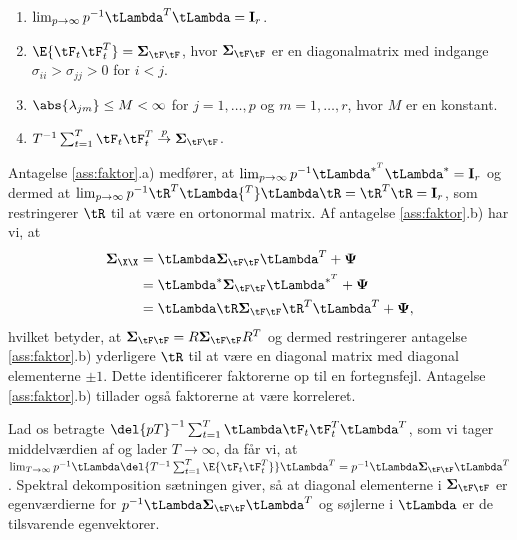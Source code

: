 %
\begin{ass} \label{ass:faktor}
\begin{enumerate}[label=\alph*)]
\item \(\lim_{p \rightarrow \infty} p^{-1} \tLambda^T \tLambda = \mathbf{I}_r\). 
\item \(\E{\tF_t \tF_t^T} = \boldsymbol{\Sigma}_{\tF\tF}\), hvor \(\boldsymbol{\Sigma}_{\tF\tF}\) er en diagonalmatrix med indgange \(\sigma_{ii} > \sigma_{jj} > 0\) for \(i < j\).
\item \(\abs{\lambda_{jm}} \leq M < \infty\) for \(j = 1, \ldots, p\) og \(m = 1, \ldots, r\), hvor \(M\) er en konstant.
\item \(T^{-1} \sum_{t=1}^T \tF_t \tF_t^T \overset{p}{\rightarrow} \boldsymbol{\Sigma}_{\tF\tF}\).
\end{enumerate}
\end{ass}
%
Antagelse \ref{ass:faktor}.a) medfører, at \(\lim_{p \rightarrow \infty} p^{-1} \tLambda^{*^T} \tLambda^* = \mathbf{I}_r\) og dermed at \(\lim_{p \rightarrow \infty} p^{-1} \tR^T \tLambda{^T} \tLambda \tR = \tR^T \tR = \mathbf{I}_r\), som restringerer \(\tR\) til at være en ortonormal matrix.
Af antagelse \ref{ass:faktor}.b) har vi, at
\begin{align*}
\boldsymbol{\Sigma}_{\X \X} &=  \tLambda  \boldsymbol{\Sigma}_{\tF\tF} \tLambda^T + \boldsymbol{\Psi} \\
&= \tLambda^* \boldsymbol{\Sigma}_{\tF\tF} \tLambda^{*^T} + \boldsymbol{\Psi} \\
&= \tLambda \tR \boldsymbol{\Sigma}_{\tF\tF} \tR^T \tLambda^T +  \boldsymbol{\Psi},
\end{align*}
hvilket betyder, at \(\boldsymbol{\Sigma}_{\tF\tF} = R \boldsymbol{\Sigma}_{\tF\tF} R^T\) og dermed restringerer antagelse \ref{ass:faktor}.b) yderligere \(\tR\) til at være en diagonal matrix med diagonal elementerne \(\pm 1\).
Dette identificerer faktorerne op til en fortegnsfejl.
Antagelse \ref{ass:faktor}.b) tillader også faktorerne at være korreleret.

Lad os betragte \(\del{pT}^{-1} \sum_{t=1}^T \tLambda \tF_t \tF_t^T \tLambda^T\), som vi tager middelværdien af og lader \(T \rightarrow \infty\), da får vi, at
\(\lim_{T \rightarrow \infty} p^{-1} \tLambda \del{T^{-1} \sum_{t=1}^T \E{\tF_t \tF_t^T}} \tLambda^T = p^{-1} \tLambda \boldsymbol{\Sigma}_{\tF\tF} \tLambda^T\).
Spektral dekomposition sætningen giver, så at diagonal elementerne i \(\boldsymbol{\Sigma}_{\tF\tF}\) er egenværdierne for \(p^{-1} \tLambda \boldsymbol{\Sigma}_{\tF\tF} \tLambda^T\) og søjlerne i \(\tLambda\) er de tilsvarende egenvektorer.
%

